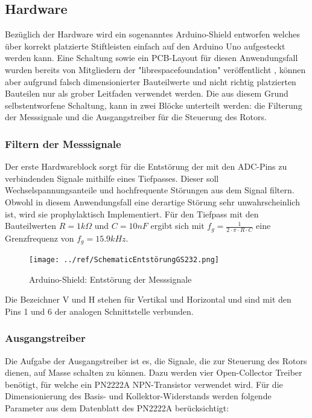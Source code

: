 \subsection{Hardware}
Bezüglich der Hardware wird ein sogenanntes Arduino-Shield entworfen welches über korrekt platzierte Stiftleisten einfach auf den Arduino Uno aufgesteckt werden kann. Eine Schaltung sowie ein PCB-Layout für diesen Anwendungsfall wurden bereits von Mitgliedern der "librespacefoundation"  veröffentlicht \cite{noauthor_librespacefoundation_nodate}, können aber aufgrund falsch dimensionierter Bauteilwerte und nicht richtig platzierten Bauteilen nur als grober Leitfaden verwendet werden. Die aus diesem Grund selbstentworfene Schaltung, kann in zwei Blöcke unterteilt werden: die Filterung der Messsignale und die Ausgangstreiber für die Steuerung des Rotors.  

\subsubsection{Filtern der Messsignale}
Der erste Hardwareblock sorgt für die Entstörung der mit den ADC-Pins zu verbindenden Signale mithilfe eines Tiefpasses. Dieser soll Wechselspannungsanteile und hochfrequente Störungen aus dem Signal filtern. Obwohl in diesem Anwendungsfall eine derartige Störung sehr unwahrscheinlich ist, wird sie prophylaktisch Implementiert. Für den Tiefpass mit den Bauteilwerten $R=1k\Omega $ und $C=10nF$ ergibt sich mit ${f}_{g}=\frac{1}{2\cdot \pi \cdot R\cdot C}$ eine Grenzfrequenz von ${f}_{g}=15.9kHz$.

\begin{figure}[H]
	\centering
	\texttt{[image: ../ref/SchematicEntstörungGS232.png]}
	\label{fig:Schaltung_Entstörung_Arduino-Shield}
	\caption{Arduino-Shield: Entstörung der Messsignale}
\end{figure}

Die Bezeichner V und H stehen für Vertikal und Horizontal und sind mit den Pins 1 und 6 der analogen Schnittstelle verbunden.

\subsubsection{Ausgangstreiber}
Die Aufgabe der Ausgangstreiber ist es, die Signale, die zur Steuerung des Rotors dienen, auf Masse schalten zu können. Dazu werden vier Open-Collector Treiber benötigt, für welche ein PN2222A NPN-Transistor verwendet wird. Für die Dimensionierung des Basis- und Kollektor-Widerstands werden folgende Parameter aus dem Datenblatt des PN2222A \cite{noauthor_pn2222a_nodate} berücksichtigt: 

